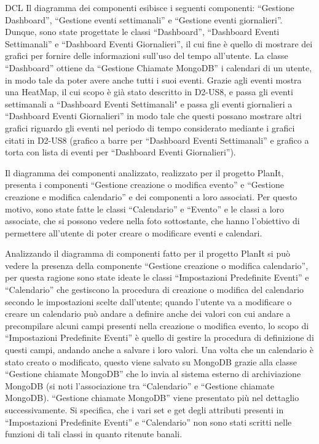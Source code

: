 \begin{listaPersonale}{DCL}
    Il diagramma dei componenti esibisce i seguenti componenti: “Gestione Dashboard”, “Gestione eventi settimanali” e “Gestione eventi giornalieri”. Dunque, sono state progettate le classi “Dashboard”, “Dashboard Eventi Settimanali” e “Dashboard Eventi Giornalieri”, il cui fine è quello di mostrare dei grafici per fornire delle informazioni sull'uso del tempo all'utente.
    La classe “Dashboard” ottiene da “Gestione Chiamate MongoDB” i calendari di un utente, in modo tale da poter avere anche tutti i suoi eventi. Grazie agli eventi mostra una HeatMap, il cui scopo è già stato descritto in D2-US8, e passa gli eventi settimanali a “Dashboard Eventi Settimanali" e passa gli eventi giornalieri a “Dashboard Eventi Giornalieri” in modo tale che questi possano mostrare altri grafici riguardo gli eventi nel periodo di tempo considerato mediante i grafici citati in D2-US8 (grafico a barre per “Dashboard Eventi Settimanali” e grafico a torta con lista di eventi per “Dashboard Eventi Giornalieri”).



    Il diagramma dei componenti analizzato, realizzato per il progetto PlanIt, presenta i componenti “Gestione creazione o modifica evento” e “Gestione creazione e modifica calendario” e dei componenti a loro associati. Per questo motivo, sono state fatte le classi “Calendario” e “Evento” e le classi a loro associate, che si possono vedere nella foto sottostante, che hanno l'obiettivo di permettere all'utente di poter creare o modificare eventi e calendari.


    \begin{listaPersonale2}[DCL]{}

        Analizzando il diagramma di componenti fatto per il progetto PlanIt si può vedere la presenza della componente “Gestione creazione o modifica calendario”, per questa ragione sono state ideate le classi “Impostazioni Predefinite Eventi” e “Calendario”  che gestiscono la procedura di creazione o modifica del calendario secondo le impostazioni scelte dall'utente; quando l'utente va a modificare o creare un calendario può andare a definire anche dei valori con cui andare a precompilare alcuni campi presenti nella creazione o modifica evento, lo scopo di “Impostazioni Predefinite Eventi” è quello di gestire la procedura di definizione di questi campi, andando anche a salvare i loro valori. Una volta che un calendario è stato creato o modificato, questo viene salvato su MongoDB grazie alla classe “Gestione chiamate MongoDB” che lo invia al sistema esterno di archiviazione MongoDB (si noti l'associazione tra “Calendario” e “Gestione chiamate MongoDB).
        “Gestione chiamate MongoDB” viene presentato più nel dettaglio successivamente.
        Si specifica, che i vari set e get degli attributi presenti in “Impostazioni Predefinite Eventi” e “Calendario” non sono stati scritti nelle funzioni di tali classi in quanto ritenute banali.



\end{listaPersonale2}
\end{listaPersonale}
